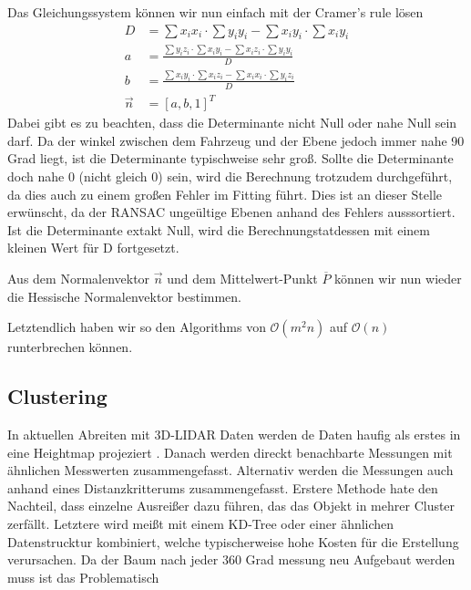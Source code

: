 \documentclass[11pt,oneside,openright]{mpreport}
\begin{document}
Das Gleichungssystem können wir nun einfach mit der Cramer's rule lösen
\begin{align*}
D &= \sum x_i x_i \cdot \sum y_i y_i - \sum x_i y_i \cdot \sum x_i y_i \\
a &= \frac{\sum y_i z_i \cdot \sum x_i y_i - \sum x_i z_i \cdot \sum y_i y_i }{D}\\
b &= \frac{\sum x_i y_i \cdot \sum x_i z_i - \sum x_i x_i \cdot \sum y_i z_i }{D}\\
\vec{n} &= [a, b, 1]^T
\end{align*}
Dabei gibt es zu beachten, dass die Determinante nicht Null oder nahe Null sein darf.
Da der winkel zwischen dem Fahrzeug und der Ebene jedoch immer nahe 90 Grad liegt, ist die Determinante typischweise sehr groß. 
Sollte die Determinante doch nahe 0 (nicht gleich 0) sein, wird die Berechnung trotzudem durchgeführt, da dies auch zu einem 
großen Fehler im Fitting führt. Dies ist an dieser Stelle erwünscht, da der \ac{RANSAC} ungeültige Ebenen anhand des Fehlers ausssortiert.
Ist die Determinante extakt Null, wird die Berechnungstatdessen mit einem kleinen Wert für D fortgesetzt.

Aus dem Normalenvektor $\vec{n}$ und dem Mittelwert-Punkt $\overline{P}$ können wir nun wieder die Hessische Normalenvektor bestimmen.

Letztendlich haben wir so den Algorithms von $\mathcal{O}(m^2n) $ auf $\mathcal{O}(n) $ runterbrechen können.

\subsection{Clustering}
In aktuellen Abreiten mit 3D-LIDAR Daten werden de Daten haufig als erstes in eine Heightmap projeziert \cite{Zhang,Himmelsbach2009,Li2016}.
Danach werden direckt benachbarte Messungen mit ähnlichen Messwerten zusammengefasst. Alternativ werden die Messungen auch anhand eines Distanzkritterums 
zusammengefasst. Erstere Methode hate den Nachteil, dass einzelne Ausreißer dazu führen, das das Objekt in mehrer Cluster zerfällt.
Letztere wird meißt mit einem KD-Tree oder einer ähnlichen Datenstrucktur kombiniert, welche typischerweise hohe Kosten für die Erstellung verursachen.
Da der Baum nach jeder 360 Grad messung neu Aufgebaut werden muss ist das Problematisch
\end{document}
